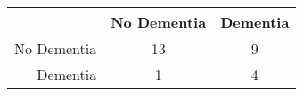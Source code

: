 \begin{table}[ht]
\centering
\begin{tabular}{r|c|c}
  \hline
 & No Dementia & Dementia \\ 
  \hline
No Dementia & 13 & 9 \\ 
  Dementia & 1 & 4 \\ 
   \hline
\end{tabular}
\end{table}
